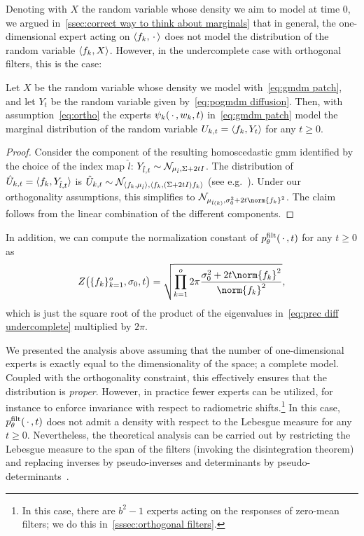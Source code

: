 Denoting with \( X \) the random variable whose density we aim to model at time \num{0}, we argued in~\cref{ssec:correct way to think about marginals} that in general, the one-dimensional expert acting on \( \langle f_k, \,\cdot\, \rangle \) does not model the distribution of the random variable \( \langle f_k, X \rangle \).
However, in the undercomplete case with orthogonal filters, this is the case:
\begin{corollary}%
	\label{cor:marginal}
	Let \( X \) be the random variable whose density we model with~\cref{eq:gmdm patch}, and let \( Y_t \) be the random variable given by~\cref{eq:pogmdm diffusion}.
	Then, with assumption~\eqref{eq:ortho} the experts \( \psi_k(\,\cdot\,, w_k, t) \) in~\eqref{eq:gmdm patch} model the marginal distribution of the random variable \( U_{k, t} = \langle f_k, Y_t \rangle \) for any \( t \geq \num{0} \).
\end{corollary}
\begin{proof}
	Consider the component of the resulting homoscedastic \gls{gmm} identified by the choice of the index map \( \hat{l} \): \( Y_{\hat{l}, t} \sim \mathcal{N}_{\mu_{\hat{l}}, \Sigma + \num{2}tI} \).
	The distribution of \( \hat{U}_{k, t} = \langle f_k, Y_{\hat{l}, t} \rangle \) is \( \hat{U}_{k, t} \sim \mathcal{N}_{\langle f_k, \mu_{\hat{l}} \rangle, \langle f_k, (\Sigma + \num{2}tI) f_k \rangle} \) (see e.g.\ \cite[theorem 3.1]{Gut2009}).
	Under our orthogonality assumptions, this simplifies to \( \NormalDistribution_{\mu_{\hat{l}(k)}, \sigma_{\num{0}}^{\num{2}}  + \num{2}t\norm{\Filter_k}^{\num{2}}} \).
	The claim follows from the linear combination of the different components.
\end{proof}
In addition, we can compute the normalization constant of \( p^{\mathrm{filt}}_\theta(\,\cdot\,, t) \) for any \( t \geq \num{0} \) as
\begin{equation}
	Z\bigl(\{ \Filter_k \}_{k=\num{1}}^\NumExperts, \sigma_{\num{0}}, t\bigr) = \sqrt{\prod_{k=\num{1}}^\NumExperts \num{2} \pi \frac{\sigma_{\num{0}}^{\num{2}} + \num{2}t\norm{\Filter_k}^{\num{2}}}{\norm{\Filter_k}^{\num{2}}}},
\end{equation}
which is just the square root of the product of the eigenvalues in~\cref{eq:prec diff undercomplete} multiplied by \( \num{2}\pi \).

We presented the analysis above assuming that the number of one-dimensional experts is exactly equal to the dimensionality of the space; a complete model.
Coupled with the orthogonality constraint, this effectively ensures that the distribution is \emph{proper}.
However, in practice fewer experts can be utilized, for instance to enforce invariance with respect to radiometric shifts.\footnote{%
	In this case, there are \( b^{\num{2}} - \num{1} \) experts acting on the responses of zero-mean filters;
	we do this in~\cref{sssec:orthogonal filters}.
}
In this case, \( p^{\mathrm{filt}}_\theta(\,\cdot\,, t) \) does not admit a density with respect to the Lebesgue measure for any \( t \geq \num{0} \).
Nevertheless, the theoretical analysis can be carried out by restricting the Lebesgue measure to the span of the filters (invoking the disintegration theorem) and replacing inverses by pseudo-inverses and determinants by pseudo-determinants~\cite{Rao1973}.
